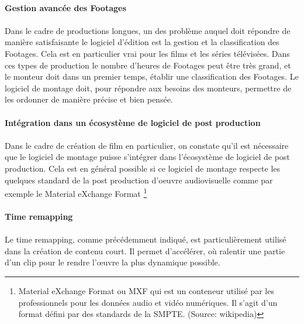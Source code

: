 \paragraph{Gestion avancée des Footages}

\paragraph{}

Dans le cadre de productions longues, un des problème auquel doit répondre de
manière satisfaisante le logiciel d'édition est la gestion et la classification
des Footages. Cela est en particulier vrai pour les films et les séries télévisées.
Dans ces types de production le nombre d'heures de Footages peut être très grand, et
le monteur doit dans un premier temps, établir une classification
des Footages. Le logiciel de montage doit, pour répondre aux besoins des monteurs,
permettre de les ordonner de manière précise et bien pensée.

\paragraph{Intégration dans un écosystème de logiciel de post production}

\paragraph{}

Dans le cadre de création de film en particulier, on constate qu'il est nécessaire
que le logiciel de montage puisse s'intégrer dans l'écosystème de logiciel de post
production. Cela est en général possible si ce logiciel de montage respecte les
quelques standard de la post production d'oeuvre audiovisuelle comme par exemple le
Material eXchange Format \footnote{Material eXchange Format ou MXF qui est un conteneur
utilisé par les professionnels pour les données audio et vidéo numériques.
Il s'agit d'un format défini par des standards de la SMPTE. (Source: wikipedia)}

\paragraph{Time remapping}

\paragraph{ }

Le time remapping, comme précédemment indiqué, est particulièrement utilisé dans
la création de contenu court. Il permet d'accélérer, où ralentir une partie d'un
clip pour le rendre l'œuvre la plus dynamique possible.

